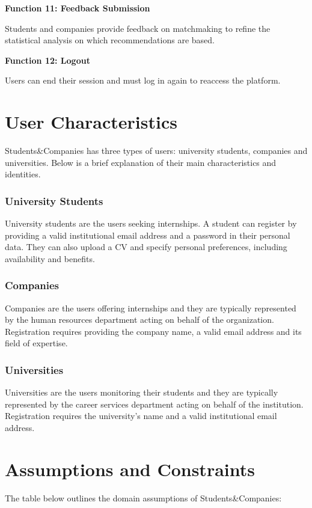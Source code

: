 \textbf{\textcolor{polimiblue}{Function 11: Feedback Submission}}

Students and companies provide feedback on matchmaking to refine the statistical analysis on which recommendations are based.

\textbf{\textcolor{polimiblue}{Function 12: Logout}}

Users can end their session and must log in again to reaccess the platform.

\section{User Characteristics}
Students\&Companies has three types of users: university students, companies and universities.
Below is a brief explanation of their main characteristics and identities.

\subsubsection{University Students}
University students are the users seeking internships.
A student can register by providing a valid institutional email address and a password in their personal data.
They can also upload a CV and specify personal preferences, including availability and benefits.

\subsubsection{Companies}
Companies are the users offering internships and they are typically represented by the human resources department acting on behalf of the organization.
Registration requires providing the company name, a valid email address and its field of expertise.

\subsubsection{Universities}
Universities are the users monitoring their students and they are typically represented by the career services department acting on behalf of the institution.
Registration requires the university's name and a valid institutional email address.

\section{Assumptions and Constraints}
The table below outlines the domain assumptions of Students\&Companies:

